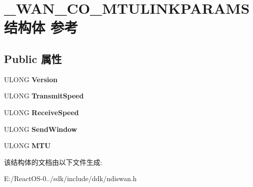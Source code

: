 \hypertarget{struct___w_a_n___c_o___m_t_u_l_i_n_k_p_a_r_a_m_s}{}\section{\+\_\+\+W\+A\+N\+\_\+\+C\+O\+\_\+\+M\+T\+U\+L\+I\+N\+K\+P\+A\+R\+A\+M\+S结构体 参考}
\label{struct___w_a_n___c_o___m_t_u_l_i_n_k_p_a_r_a_m_s}
\subsection*{Public 属性}
\begin{DoxyCompactItemize}
\item 
\mbox{\label{struct___w_a_n___c_o___m_t_u_l_i_n_k_p_a_r_a_m_s_adb1f879f744abe45ebc51ae12277a324}} 
U\+L\+O\+NG {\bfseries Version}
\item 
\mbox{\label{struct___w_a_n___c_o___m_t_u_l_i_n_k_p_a_r_a_m_s_a31fec645ca627d0ae8eabf5ea9cb6e02}} 
U\+L\+O\+NG {\bfseries Transmit\+Speed}
\item 
\mbox{\label{struct___w_a_n___c_o___m_t_u_l_i_n_k_p_a_r_a_m_s_a911f116fd77714a6f1618128338edb29}} 
U\+L\+O\+NG {\bfseries Receive\+Speed}
\item 
\mbox{\label{struct___w_a_n___c_o___m_t_u_l_i_n_k_p_a_r_a_m_s_a025827ec3a7a2b2cd8c26ae477144e3e}} 
U\+L\+O\+NG {\bfseries Send\+Window}
\item 
\mbox{\label{struct___w_a_n___c_o___m_t_u_l_i_n_k_p_a_r_a_m_s_a942ccdaefd5a8941060c15e4c175f605}} 
U\+L\+O\+NG {\bfseries M\+TU}
\end{DoxyCompactItemize}


该结构体的文档由以下文件生成\+:\begin{DoxyCompactItemize}
\item 
E\+:/\+React\+O\+S-\/0../sdk/include/ddk/ndiswan.\+h\end{DoxyCompactItemize}
